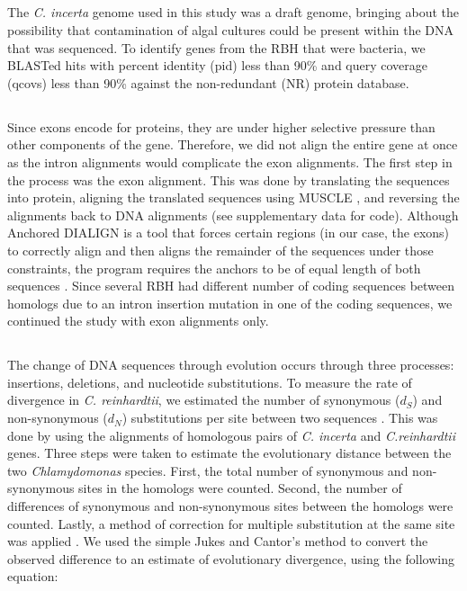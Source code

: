 \documentclass[letterpaper, 10 pt, conference]{ieeeconf}  %
\begin{document}
\subsection*{}
The \textit{C. incerta} genome used in this study was a draft genome, bringing about the possibility that contamination of algal cultures could be present within the DNA that was sequenced. To identify genes from the RBH that were bacteria, we BLASTed hits with percent identity (pid) less than 90\% and query coverage (qcovs) less than 90\% against the non-redundant (NR) protein database.  
 


\subsection*{}
Since exons encode for proteins, they are under higher selective pressure than other components of the gene. Therefore, we did not align the entire gene at once as the intron alignments would complicate the exon alignments. The first step in the process was the exon alignment. This was done by translating the sequences into protein, aligning the translated sequences using MUSCLE \cite{e04}, and reversing the alignments back to DNA alignments (see supplementary data for code).  Although Anchored DIALIGN is a tool that forces certain regions (in our case, the exons) to correctly align and then aligns the remainder of the sequences under those constraints, the program requires the anchors to be of equal length of both sequences \cite{mpps06}. Since several RBH had different number of coding sequences between homologs due to an intron insertion mutation in one of the coding sequences, we continued the study with exon alignments only. 


\subsection*{}
The change of DNA sequences through evolution occurs through three processes: insertions, deletions, and nucleotide substitutions. To measure the rate of divergence in \textit{C. reinhardtii}, we estimated the number of synonymous ($d_S$)  and non-synonymous ($d_N$) substitutions per site between two sequences \cite{yn00}. This was done by using the alignments of homologous pairs of \textit{C. incerta} and \textit{C.reinhardtii} genes. Three steps were taken to estimate the evolutionary distance between the two \textit{Chlamydomonas} species. First, the total number of synonymous and non-synonymous sites in the homologs were counted. Second, the number of differences of synonymous and non-synonymous sites between the homologs were counted. Lastly, a method of correction for multiple substitution at the same site was applied \cite{yn00}. We used the simple Jukes and Cantor’s method to convert the observed difference to an estimate of evolutionary divergence, using the following equation: 
\end{document}
